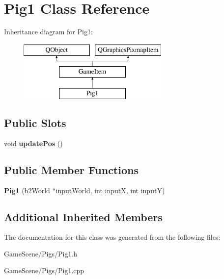 \hypertarget{classPig1}{}\section{Pig1 Class Reference}
\label{classPig1}
Inheritance diagram for Pig1\+:\begin{figure}[H]
\begin{center}
\leavevmode
\includegraphics[height=3.000000cm]{classPig1}
\end{center}
\end{figure}
\subsection*{Public Slots}
\begin{DoxyCompactItemize}
\item 
void {\bfseries update\+Pos} ()\hypertarget{classPig1_a64bbc503af0ba01b038099f5d16e978a}{}\label{classPig1_a64bbc503af0ba01b038099f5d16e978a}

\end{DoxyCompactItemize}
\subsection*{Public Member Functions}
\begin{DoxyCompactItemize}
\item 
{\bfseries Pig1} (b2\+World $\ast$input\+World, int inputX, int inputY)\hypertarget{classPig1_a31f8ee0c55f6ccd6714029f83f62dc6d}{}\label{classPig1_a31f8ee0c55f6ccd6714029f83f62dc6d}

\end{DoxyCompactItemize}
\subsection*{Additional Inherited Members}


The documentation for this class was generated from the following files\+:\begin{DoxyCompactItemize}
\item 
Game\+Scene/\+Pigs/Pig1.\+h\item 
Game\+Scene/\+Pigs/Pig1.\+cpp\end{DoxyCompactItemize}
